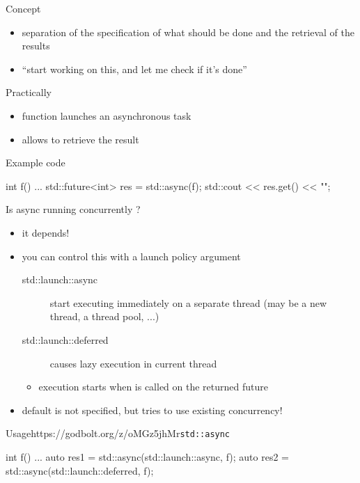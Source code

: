 \begin{frame}[fragile]
  \begin{block}{Concept}
    \begin{itemize}
    \item separation of the specification of what should be done and the retrieval of the results
    \item ``start working on this, and let me check if it's done''
    \end{itemize}
  \end{block}
  \pause
  \begin{block}{Practically}
    \begin{itemize}
    \item {} function launches an asynchronous task
    \item {} allows to retrieve the result
    \end{itemize}
  \end{block}
  \pause
  \begin{exampleblock}{Example code}
    \begin{cppcode*}{}
      int f() {...}
      std::future<int> res = std::async(f);
      std::cout << res.get() << "\n";
    \end{cppcode*}
  \end{exampleblock}
\end{frame}

\begin{frame}[fragile]
  \begin{block}{Is async running concurrently ?}
    \begin{itemize}
    \item it depends!
    \item you can control this with a launch policy argument
      \begin{description}
      \item[std::launch::async] start executing immediately on a separate thread (may be a new thread, a thread pool, ...)
      \item[std::launch::deferred] causes lazy execution in current thread
      \end{description}
      \begin{itemize}
      \item execution starts when  is called on the returned future
      \end{itemize}
    \item default is not specified, but tries to use existing concurrency!
    \end{itemize}
  \end{block}
  \pause
  \begin{exampleblockGB}{Usage}{https://godbolt.org/z/oMGz5jhMr}{\texttt{std::async}}
    \begin{cppcode*}{}
      int f() {...}
      auto res1 = std::async(std::launch::async, f);
      auto res2 = std::async(std::launch::deferred, f);
    \end{cppcode*}
  \end{exampleblockGB}
\end{frame}

